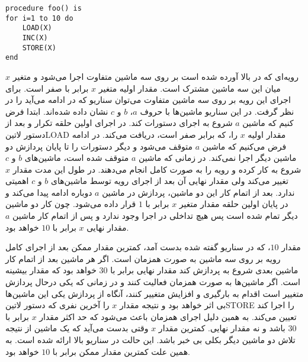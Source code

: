 
\lstset{language=Pascal} 
\begin{latin}
\begin{lstlisting}[frame=single]  % Start your code-block
procedure foo() is
for i=1 to 10 do
    LOAD(X)
    INC(X)
    STORE(X)
end
\end{lstlisting}
\end{latin}

رویه‌ای که در بالا آورده شده است بر روی سه ماشین متفاوت اجرا می‌شود و متغیر $x$‌ میان
این سه ماشین مشترک است. مقدار اولیه متغیر $x$ برابر با صفر است.
برای اجرای این رویه بر روی سه ماشین متفاوت می‌توان سناریو که در ادامه می‌آید را در نظر گرفت.
در این سناریو ماشین‌ها با حروف 
$a$،
$b$ و
$c$
نشان داده شده‌اند.
ابتدا فرض کنیم که ماشین $a$ شروع به اجرای دستورات کند. در اجرای اولین حلقه تکرار
و بعد از دستور ‌لاتین{LOAD} مقدار اولیه $x$ را، که برابر صفر است، دریافت می‌کند.
در ادامه فرض می‌کنیم که ماشین $a$ متوقف می‌شود و دیگر دستورات را تا پایان
پردازش دو ماشین دیگر اجرا نمی‌کند. در زمانی که ماشین $a$ متوقف شده است،
ماشین‌های $b$ و $c$ شروع به کار کرده و رویه را به صورت کامل انجام می‌دهند. در طول
این مدت مقدار $x$ تغییر می‌کند ولی مقدار نهایی آن بعد از اجرای رویه توسط 
ماشین‌های $b$ و $c$ اهمیتی ندارد. بعد از اتمام کار این دو ماشین،
پردازش در ماشین $a$ دوباره ادامه پیدا می‌کند و در پایان اولین حلقه مقدار متغیر $x$
برابر با $1$ قرار داده می‌شود. چون کار دو ماشین دیگر تمام شده است پس هیچ تداخلی در
اجرا وجود ندارد و پس از اتمام کار ماشین $a$ مقدار نهایی $x$ برابر با $10$ خواهد بود.

مقدار $10$، که در سناریو گفته شده بدست آمد، کمترین مقدار ممکن بعد از اجرای کامل رویه بر
روی سه ماشین به صورت همزمان است. اگر هر ماشین بعد از اتمام کار ماشین بعدی شروع به پردازش
کند مقدار نهایی برابر با $30$ خواهد بود که مقدار بیشینه است. اگر ماشین‌ها به صورت همزمان
فعالیت کنند و در زمانی که یکی درحال پردازش متغییر است اقدام به بارگیری و افزایش متغییر کنند،
آنگاه از پردازش یکی این ماشین‌ها بی اثر خواهد بود و نتیجه مقدار $x$ را آخرین نفری که دستور
‌لاتین{STORE} را اجرا کند تعیین می‌کند. به همین دلیل اجرای همزمان باعث می‌شود که حد اکثر مقدار $x$
برابر با $30$ باشد و نه مقدار نهایی. کمترین مقدار $x$ وقتی بدست می‌آید که یک ماشین از نتیجه تلاش دو ماشین
دیگر بکلی بی خبر باشد. این حالت در سناریو بالا ارائه شده است. به همین علت کمترین مقدار ممکن برابر با $10$
خواهد بود.
